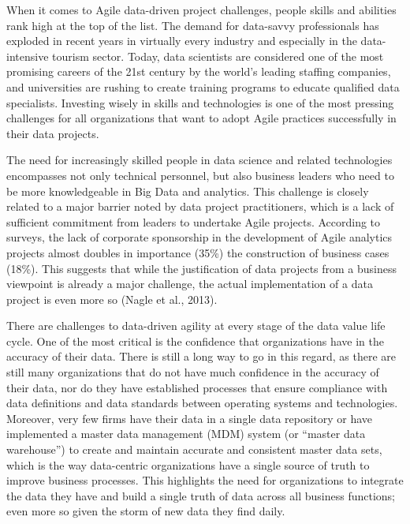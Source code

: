 \documentclass[
  letterpaper,
  DIV=11,
  numbers=noendperiod]{scrreprt}
\begin{document}
When it comes to Agile data-driven project challenges, people skills and
abilities rank high at the top of the list. The demand for data-savvy
professionals has exploded in recent years in virtually every industry
and especially in the data-intensive tourism sector. Today, data
scientists are considered one of the most promising careers of the 21st
century by the world's leading staffing companies, and universities are
rushing to create training programs to educate qualified data
specialists. Investing wisely in skills and technologies is one of the
most pressing challenges for all organizations that want to adopt Agile
practices successfully in their data projects.

The need for increasingly skilled people in data science and related
technologies encompasses not only technical personnel, but also business
leaders who need to be more knowledgeable in Big Data and analytics.
This challenge is closely related to a major barrier noted by data
project practitioners, which is a lack of sufficient commitment from
leaders to undertake Agile projects. According to surveys, the lack of
corporate sponsorship in the development of Agile analytics projects
almost doubles in importance (35\%) the construction of business cases
(18\%). This suggests that while the justification of data projects from
a business viewpoint is already a major challenge, the actual
implementation of a data project is even more so (Nagle et al., 2013).

There are challenges to data-driven agility at every stage of the data
value life cycle. One of the most critical is the confidence that
organizations have in the accuracy of their data. There is still a long
way to go in this regard, as there are still many organizations that do
not have much confidence in the accuracy of their data, nor do they have
established processes that ensure compliance with data definitions and
data standards between operating systems and technologies. Moreover,
very few firms have their data in a single data repository or have
implemented a master data management (MDM) system (or ``master data
warehouse'') to create and maintain accurate and consistent master data
sets, which is the way data-centric organizations have a single source
of truth to improve business processes. This highlights the need for
organizations to integrate the data they have and build a single truth
of data across all business functions; even more so given the storm of
new data they find daily.
\end{document}
